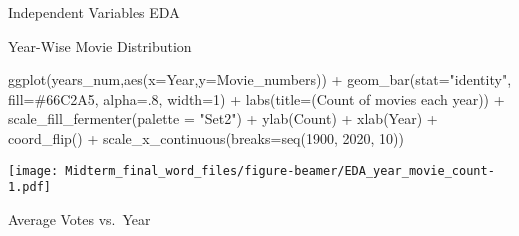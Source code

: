 \documentclass[
  ignorenonframetext,
]{beamer}
\newenvironment{Shaded}{\begin{snugshade}}{\end{snugshade}}
\newcommand{\AttributeTok}[1]{\textcolor[rgb]{0.77,0.63,0.00}{#1}}
\newcommand{\CommentTok}[1]{\textcolor[rgb]{0.56,0.35,0.01}{\textit{#1}}}
\newcommand{\DecValTok}[1]{\textcolor[rgb]{0.00,0.00,0.81}{#1}}
\newcommand{\FunctionTok}[1]{\textcolor[rgb]{0.00,0.00,0.00}{#1}}
\newcommand{\NormalTok}[1]{#1}
\newcommand{\OtherTok}[1]{\textcolor[rgb]{0.56,0.35,0.01}{#1}}
\newcommand{\SpecialCharTok}[1]{\textcolor[rgb]{0.00,0.00,0.00}{#1}}
\newcommand{\StringTok}[1]{\textcolor[rgb]{0.31,0.60,0.02}{#1}}
\begin{document}
\begin{frame}[fragile]{Independent Variables EDA}
\begin{block}{Year-Wise Movie Distribution}
\begin{Shaded}
\begin{Highlighting}[]
\FunctionTok{ggplot}\NormalTok{(years\_num,}\FunctionTok{aes}\NormalTok{(}\AttributeTok{x=}\NormalTok{Year,}\AttributeTok{y=}\NormalTok{Movie\_numbers)) }\SpecialCharTok{+} 
  \FunctionTok{geom\_bar}\NormalTok{(}\AttributeTok{stat=}\StringTok{"identity"}\NormalTok{, }\AttributeTok{fill=}\StringTok{\textquotesingle{}\#66C2A5\textquotesingle{}}\NormalTok{, }\AttributeTok{alpha=}\NormalTok{.}\DecValTok{8}\NormalTok{, }\AttributeTok{width=}\DecValTok{1}\NormalTok{) }\SpecialCharTok{+} 
    \FunctionTok{labs}\NormalTok{(}\AttributeTok{title=}\NormalTok{(}\StringTok{\textquotesingle{}Count of movies each year\textquotesingle{}}\NormalTok{)) }\SpecialCharTok{+} 
      \FunctionTok{scale\_fill\_fermenter}\NormalTok{(}\AttributeTok{palette =} \StringTok{"Set2"}\NormalTok{) }\SpecialCharTok{+} 
        \FunctionTok{ylab}\NormalTok{(}\StringTok{\textquotesingle{}Count\textquotesingle{}}\NormalTok{) }\SpecialCharTok{+}
          \FunctionTok{xlab}\NormalTok{(}\StringTok{\textquotesingle{}Year\textquotesingle{}}\NormalTok{) }\SpecialCharTok{+}
            \FunctionTok{coord\_flip}\NormalTok{() }\SpecialCharTok{+}
              \FunctionTok{scale\_x\_continuous}\NormalTok{(}\AttributeTok{breaks=}\FunctionTok{seq}\NormalTok{(}\DecValTok{1900}\NormalTok{, }\DecValTok{2020}\NormalTok{, }\DecValTok{10}\NormalTok{))}
\end{Highlighting}
\end{Shaded}

\texttt{[image: Midterm\_final\_word\_files/figure-beamer/EDA\_year\_movie\_count-1.pdf]}
\end{block}

\begin{block}{Average Votes vs.~Year}
\protect\hypertarget{average-votes-vs.-year}{}
\begin{Shaded}
\end{Shaded}


\end{block}
\end{frame}
\end{document}
